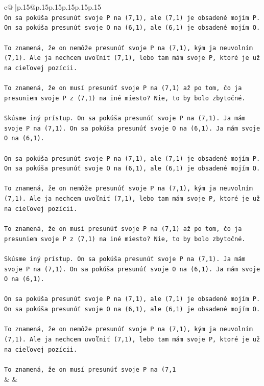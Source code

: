 \documentclass{article}
\begin{document}
{\begin{supertabular}{c@{$\;$}|p{.15\linewidth}@{}p{.15\linewidth}p{.15\linewidth}p{.15\linewidth}p{.15\linewidth}p{.15\linewidth}}
{{{\\ 
\texttt{On sa pokúša presunúť svoje P na (7,1), ale (7,1) je obsadené mojím P. On sa pokúša presunúť svoje O na (6,1), ale (6,1) je obsadené mojím O.} \\
\\ 
\texttt{To znamená, že on nemôže presunúť svoje P na (7,1), kým ja neuvolním (7,1). Ale ja nechcem uvoľniť (7,1), lebo tam mám svoje P, ktoré je už na cieľovej pozícii.} \\
\\ 
\texttt{To znamená, že on musí presunúť svoje P na (7,1) až po tom, čo ja presuniem svoje P z (7,1) na iné miesto? Nie, to by bolo zbytočné.} \\
\\ 
\texttt{Skúsme iný prístup. On sa pokúša presunúť svoje P na (7,1). Ja mám svoje P na (7,1). On sa pokúša presunúť svoje O na (6,1). Ja mám svoje O na (6,1).} \\
\\ 
\texttt{On sa pokúša presunúť svoje P na (7,1), ale (7,1) je obsadené mojím P. On sa pokúša presunúť svoje O na (6,1), ale (6,1) je obsadené mojím O.} \\
\\ 
\texttt{To znamená, že on nemôže presunúť svoje P na (7,1), kým ja neuvolním (7,1). Ale ja nechcem uvoľniť (7,1), lebo tam mám svoje P, ktoré je už na cieľovej pozícii.} \\
\\ 
\texttt{To znamená, že on musí presunúť svoje P na (7,1) až po tom, čo ja presuniem svoje P z (7,1) na iné miesto? Nie, to by bolo zbytočné.} \\
\\ 
\texttt{Skúsme iný prístup. On sa pokúša presunúť svoje P na (7,1). Ja mám svoje P na (7,1). On sa pokúša presunúť svoje O na (6,1). Ja mám svoje O na (6,1).} \\
\\ 
\texttt{On sa pokúša presunúť svoje P na (7,1), ale (7,1) je obsadené mojím P. On sa pokúša presunúť svoje O na (6,1), ale (6,1) je obsadené mojím O.} \\
\\ 
\texttt{To znamená, že on nemôže presunúť svoje P na (7,1), kým ja neuvolním (7,1). Ale ja nechcem uvoľniť (7,1), lebo tam mám svoje P, ktoré je už na cieľovej pozícii.} \\
\\ 
\texttt{To znamená, že on musí presunúť svoje P na (7,1} \\
            }
        }
    }
    & & \\ \\


\end{supertabular}}
\end{document}
